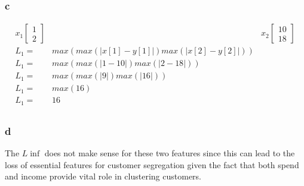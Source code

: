 \documentclass[11pt]{article}
\begin{document}
			\subsubsection*{c}
				\begin{align}
				x_1\begin{bmatrix}
				1\\2
				\end{bmatrix}&
				&x_2\begin{bmatrix}
				10\\18
				\end{bmatrix} \\
				L_1=&max(max(|x[1]-y[1]|)max(|x[2]-y[2]|))\\
				L_1=&max(max(|1-10|)max(|2-18|))\\
				L_1=&max(max(|9|)max(|16|))\\
				L_1=&max(16)\\
				L_1=&16\\
				\end{align}
			\subsubsection*{d}
				The $L\inf$ does not make sense for these two features since this can lead to the loss of essential features for customer segregation given the fact that both spend and income provide vital role in clustering customers.
\end{document}
